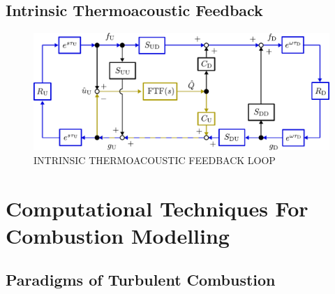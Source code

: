






\subsection{Intrinsic Thermoacoustic Feedback}

\begin{figure}[t]
\centering
\includegraphics[scale=0.65]{assets/imgs/ITA-mech.pdf}
\caption{INTRINSIC THERMOACOUSTIC FEEDBACK LOOP}
\label{fig:ita-loop}
\end{figure}



\cite{emmert2015IntrinsicThermoacousticInstability}
\cite{silva2023IntrinsicThermoacousticInstabilities}
\cite{hoeijmakers2014IntrinsicInstabilityFlame}
\cite{hoeijmakers2016FlameDominatedThermoacoustic}
\cite{orchini2025TrackingAcousticIntrinsic}
\cite{chen2024BiglobalLinearStability}






\section[Computational Combustion Modelling]{Computational Techniques For Combustion Modelling}

\subsection{Paradigms of Turbulent Combustion}


